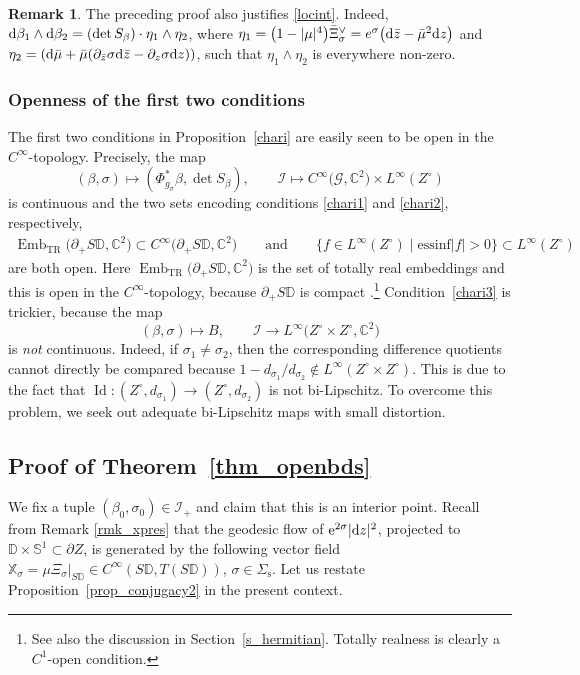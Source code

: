 \documentclass[10pt,a4paper]{amsart}
\numberwithin{equation}{section}
\theoremstyle{definition}
\newtheorem{Remark}[Theorem]{Remark}
\newcommand{\C}{\mathbb{C}} %
\newcommand{\DD}{\mathbb{D}} %
\newcommand{\1}{{\bf 1}}
\newcommand{\Id}{\operatorname{Id}}
\begin{document}
\begin{Remark}\label{rlocint}
The preceding proof also justifies \eqref{locint}. Indeed, ${\rm d}\beta_1 \wedge {\rm d}\beta_2 = (\det S_\beta)\cdot \eta_1\wedge \eta_2$, where $\eta_1 = \bigl(1-|\mu|^4\bigr) \bar\Xi_\sigma^\vee = e^\sigma \bigl({\rm d}\bar z - \bar \mu^2 {\rm d}z\bigr)$ and $\eta_2 = ({\rm d}\bar \mu + \bar \mu(\partial_{\bar z}\sigma {\rm d}\bar z - \partial_z \sigma {\rm d}z))$, such that $\eta_1\wedge \eta_2$ is everywhere non-zero.
\end{Remark}


\subsubsection{Openness of the first two conditions} The first two conditions in Proposition~\ref{chari} are easily seen to be open in the $C^\infty$-topology. Precisely, the map
\[
(\beta,\sigma) \mapsto (\Phi_{g_\sigma}^*\beta,  \det S_\beta ),\qquad \mathcal I\mapsto C^\infty\bigl(\mathcal G,\C^2\bigr)\times L^\infty(Z^\circ)	
\]
is continuous and the two sets encoding conditions \ref{chari1} and \ref{chari2}, respectively,
\begin{gather*}
\operatorname{Emb}_\mathrm{TR}\bigl(\partial_+S\DD,\C^2\bigr)\subset C^\infty\bigl(\partial_+S\DD,\C^2\bigr)\!\qquad \text{and} \!\qquad\{f\in L^\infty(Z^\circ)\mid \mathrm{ess inf } |f| > 0 \} \subset L^\infty(Z^\circ)
\end{gather*}
are both open. Here $\operatorname{Emb}_\mathrm{TR}\bigl(\partial_+ S\DD,\C^2\bigr)$ is the set of totally real embeddings and this is open in the $C^\infty$-topology, because $\partial_+S\DD$ is compact \cite[Chapter~2, Theorem~1.4]{Hir76}.\footnote{See also the discussion in Section~\ref{s_hermitian}. Totally realness is clearly a $C^1$-open condition.}
Condition~\ref{chari3} is trickier, because the map
\[
	(\beta,\sigma)\mapsto B,\qquad \mathcal I\rightarrow L^\infty\bigl(Z^\circ\times Z^\circ,\C^2\bigr)
\]
is {\it not} continuous. Indeed, if $\sigma_1\neq \sigma_2$, then the corresponding difference quotients cannot directly be compared because $1-d_{\sigma_1}/d_{\sigma_2}\notin L^\infty(Z^\circ\times Z^\circ)$. This is due to the fact that $\Id\colon (Z^\circ,d_{\sigma_1})\rightarrow (Z^\circ,d_{\sigma_2})$ is not bi-Lipschitz. To overcome this problem, we seek out adequate bi-Lipschitz maps with small distortion.

\subsection[Proof of Theorem 3.10]{Proof of Theorem~\ref{thm_openbds}} \label{pf_openbds} We fix a tuple $(\beta_0,\sigma_0) \in \mathcal I_+$ and claim that this is an interior point. Recall from Remark \ref{rmk_xpres} that the geodesic flow of ${\rm e}^{2\sigma}|{\rm d} z|^2$, projected to $\DD\times \mathbb S^1\subset \partial Z$, is generated by the following vector field
$
\mathbb X_\sigma = \mu \Xi_\sigma|_{S\DD}\in C^\infty(S\DD,T(S\DD))$,  $\sigma \in \Sigma_\mathrm{s}$.
Let us restate Proposition~\ref{prop_conjugacy2} in the present context.
\end{document}
